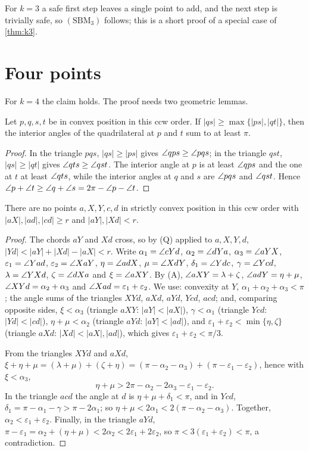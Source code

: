 For $k=3$ a safe first step leaves a single point to add, and the next step
is trivially safe, so $(\mathrm{SBM}_3)$ follows; this is a short proof of a
special case of \cref{thm:k3}.

\section{Four points}
For $k=4$ the claim holds. The proof needs two geometric lemmas.

\begin{lemma}\label{lem:opposite}
Let $p,q,s,t$ be in convex position in this ccw order. If
$|qs|\ge\max\{|ps|,|qt|\}$, then the interior angles of the quadrilateral at
$p$ and $t$ sum to at least $\pi$.
\end{lemma}
\begin{proof}
In the triangle $pqs$, $|qs|\ge|ps|$ gives $\angle qps\ge\angle pqs$; in the
triangle $qst$, $|qs|\ge|qt|$ gives $\angle qts\ge\angle qst$. The interior angle
at $p$ is at least $\angle qps$ and the one at $t$ at least $\angle qts$, while
the interior angles at $q$ and $s$ are $\angle pqs$ and $\angle qst$. Hence
$\angle p+\angle t\ge\angle q+\angle s=2\pi-\angle p-\angle t$.
\end{proof}

\begin{lemma}\label{lem:core}
There are no points $a,X,Y,c,d$ in strictly convex position in this ccw order
with $|aX|,|ad|,|cd|\ge r$ and $|aY|,|Xd|<r$.
\end{lemma}
\begin{proof}
The chords $aY$ and $Xd$ cross, so by (Q) applied to $a,X,Y,d$,
$|Yd|<|aY|+|Xd|-|aX|<r$. Write $\alpha_1=\angle cYd$, $\alpha_2=\angle dYa$,
$\alpha_3=\angle aYX$, $\varepsilon_1=\angle Yad$, $\varepsilon_2=\angle XaY$,
$\eta=\angle adX$, $\mu=\angle XdY$, $\delta_1=\angle Ydc$, $\gamma=\angle Ycd$,
$\lambda=\angle YXd$, $\zeta=\angle dXa$ and $\xi=\angle aXY$. By (A),
$\angle aXY=\lambda+\zeta$, $\angle adY=\eta+\mu$, $\angle XYd=\alpha_2+\alpha_3$
and $\angle Xad=\varepsilon_1+\varepsilon_2$. We use: convexity at $Y$,
$\alpha_1+\alpha_2+\alpha_3<\pi$; the angle sums of the triangles $XYd$,
$aXd$, $aYd$, $Ycd$, $acd$; and, comparing opposite sides,
$\xi<\alpha_3$ (triangle $aXY$: $|aY|<|aX|$),
$\gamma<\alpha_1$ (triangle $Ycd$: $|Yd|<|cd|$),
$\eta+\mu<\alpha_2$ (triangle $aYd$: $|aY|<|ad|$), and
$\varepsilon_1+\varepsilon_2<\min\{\eta,\zeta\}$ (triangle $aXd$:
$|Xd|<|aX|,|ad|$), which gives $\varepsilon_1+\varepsilon_2<\pi/3$.

From the triangles $XYd$ and $aXd$,
$\xi+\eta+\mu=(\lambda+\mu)+(\zeta+\eta)
=(\pi-\alpha_2-\alpha_3)+(\pi-\varepsilon_1-\varepsilon_2)$, hence with
$\xi<\alpha_3$,
\[\eta+\mu>2\pi-\alpha_2-2\alpha_3-\varepsilon_1-\varepsilon_2.\]
In the triangle $acd$ the angle at $d$ is $\eta+\mu+\delta_1<\pi$, and in
$Ycd$, $\delta_1=\pi-\alpha_1-\gamma>\pi-2\alpha_1$; so $\eta+\mu<2\alpha_1<
2(\pi-\alpha_2-\alpha_3)$. Together, $\alpha_2<\varepsilon_1+\varepsilon_2$.
Finally, in the triangle $aYd$,
$\pi-\varepsilon_1=\alpha_2+(\eta+\mu)<2\alpha_2<2\varepsilon_1+2\varepsilon_2$,
so $\pi<3(\varepsilon_1+\varepsilon_2)<\pi$, a contradiction.
\end{proof}


